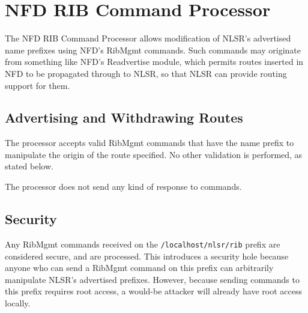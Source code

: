 \section{NFD RIB Command Processor}
\label{sec:nfd-rib-commands}

The NFD RIB Command Processor allows modification of NLSR's advertised
name prefixes using NFD's RibMgmt commands. Such commands may
originate from something like NFD's Readvertise module, which permits
routes inserted in NFD to be propagated through to NLSR, so that NLSR
can provide routing support for them.

\subsection{Advertising and Withdrawing Routes}
The processor accepts valid RibMgmt commands that have the name prefix
to manipulate the origin of the route specified. No other validation
is performed, as stated below.

The processor does not send any kind of response to commands.

\subsection{Security}
Any RibMgmt commands received on the \texttt{/localhost/nlsr/rib}
prefix are considered secure, and are processed. This introduces a
security hole because anyone who can send a RibMgmt command on this
prefix can arbitrarily manipulate NLSR's advertised prefixes. However,
because sending commands to this prefix requires root access, a
would-be attacker will already have root access locally.

